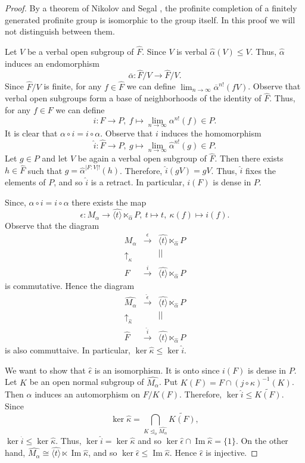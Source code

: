 \documentclass{amsart}
\theoremstyle{definition}
\theoremstyle{remark}
\DeclareMathOperator{\im}{Im}
\begin{document}
\begin{proof} By a theorem of Nikolov and Segal \cite{NS07}, the profinite completion of a finitely generated profinite group is isomorphic to the group itself. In this proof we will not distinguish between them.

Let $V$ be a verbal open subgroup of $\widehat F$. Since $V$ is verbal $\widehat \alpha(V)\le V$. Thus,  $\widehat \alpha$ induces an endomorphism $$\overline \alpha: \widehat F/V\to \widehat F/V.$$
Since $\widehat F/V$ is finite, for any $f\in \widehat F$ we can define $\lim_{n\to \infty} \overline{\alpha}^{n!}(fV)$. Observe that verbal open subgroups form a base of neighborhoods of the identity of $\widehat F$. Thus, for any $f\in   F$ we can define
$$  i:  F\to P,\  f\mapsto \lim_{n\to \infty} {\alpha}^{n!}(f)\in P.$$  It is clear that $  \alpha\circ  i= i \circ  \alpha$. Observe that $i$ induces the homomorphism 
$$ \widehat  i:   \widehat F\to P,\  g\mapsto \lim_{n\to \infty} \widehat{\alpha}^{n!}(g)\in P.$$
Let  $g\in P$ and let $V$ be again a   verbal open subgroup of $\widehat F$. Then there exists $h\in \widehat F$ such that $g=\widehat \alpha^{|F:V|!}(h)$. Therefore, $\widehat i(gV)=gV$. Thus, $\widehat i$ fixes the elements of $P$, and so $\widehat i$ is a retract. In particular, $i(F)$ is dense in $P$.

Since, $  \alpha\circ  i= i \circ  \alpha$ there exists the map
$$\epsilon :M_\alpha\to \widehat {\langle t\rangle}\ltimes_{\widehat \alpha} P, \ t\mapsto t, \ \kappa(f)\mapsto i(f). $$
Observe that the diagram
$$\begin{array}{ccc}
M_\alpha & \xrightarrow {\epsilon} &\widehat {\langle t\rangle}\ltimes_{\widehat \alpha} P\\
 \uparrow_{\kappa}&&||\\
F&\xrightarrow{i}&\widehat {\langle t\rangle}\ltimes_{\widehat \alpha} P \end{array}$$ is commutative. Hence  the diagram
$$\begin{array}{ccc}
\widehat{M_\alpha} & \xrightarrow {\widehat{\epsilon}} &\widehat {\langle t\rangle}\ltimes_{\widehat \alpha} P\\
 \uparrow_{\widehat{\kappa}}&&||\\
\widehat F&\xrightarrow{\widehat i}&\widehat {\langle t\rangle}\ltimes_{\widehat \alpha} P
\end{array}$$ is also commuttaive. In particular, $\ker \widehat \kappa \le \ker \widehat i$.

We want to show that $\widehat \epsilon$ is an isomorphism.
It is onto since $i(F)$ is dense in $P$.  Let $K$ be an open  normal subgroup of   $\widehat{M_\alpha}$. Put $K(F)=F\cap ( j\circ \kappa)^{-1}( K )$. 
Then $\alpha$ induces an automorphism on $F/ K(F)$. Therefore, $\ker \widehat  i\le \widetilde {K(F)}$. 
Since $$\ker \widehat \kappa=\bigcap_{K\unlhd_o \widehat{M_\alpha}} \widetilde{K(F)},$$  $\ker \widehat   i\le\ker \widehat  \kappa$. Thus, $\ker \widehat   i=\ker \widehat  \kappa$ and so $\ker \widehat \epsilon\cap \im \widehat \kappa=\{1\}$. On the other hand, $\widehat{M_\alpha}\cong \widehat {\langle t\rangle}\ltimes \im \widehat \kappa$, and so $\ker \widehat \epsilon\le \im \widehat \kappa$. Hence  $\widehat  \epsilon$ is injective.
\end{proof}
\end{document}
